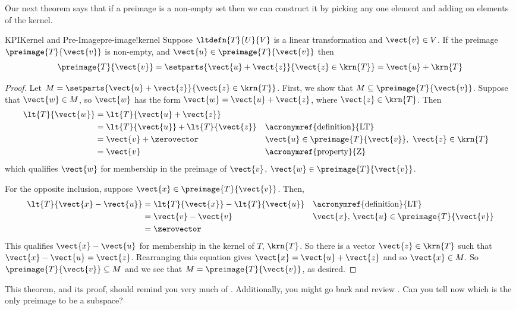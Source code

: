 %
Our next theorem says that if a preimage is a non-empty set then we can construct it by picking any one element and adding on elements of the kernel.
%
\begin{theorem}{KPI}{Kernel and Pre-Image}{pre-image!kernel}
Suppose $\ltdefn{T}{U}{V}$ is a linear transformation and $\vect{v}\in V$.  If the preimage $\preimage{T}{\vect{v}}$ is non-empty, and $\vect{u}\in\preimage{T}{\vect{v}}$  then 
%
\begin{equation*}
\preimage{T}{\vect{v}}=
\setparts{\vect{u}+\vect{z}}{\vect{z}\in\krn{T}}
=\vect{u}+\krn{T}
\end{equation*}
%
\end{theorem}
%
\begin{proof}
Let $M=\setparts{\vect{u}+\vect{z}}{\vect{z}\in\krn{T}}$.  First, we show that $M\subseteq\preimage{T}{\vect{v}}$.  Suppose that $\vect{w}\in M$, so $\vect{w}$ has the form $\vect{w}=\vect{u}+\vect{z}$, where $\vect{z}\in\krn{T}$.  Then
%
\begin{align*}
\lt{T}{\vect{w}}&=\lt{T}{\vect{u}+\vect{z}}\\
&=\lt{T}{\vect{u}}+\lt{T}{\vect{z}}&&\text{\acronymref{definition}{LT}}\\
&=\vect{v}+\zerovector&&\vect{u}\in\preimage{T}{\vect{v}},\ \vect{z}\in\krn{T}\\
&=\vect{v}&&\text{\acronymref{property}{Z}}
\end{align*}
%
which qualifies $\vect{w}$ for membership in the preimage of $\vect{v}$, $\vect{w}\in\preimage{T}{\vect{v}}$.\par
%
For the opposite inclusion, suppose $\vect{x}\in\preimage{T}{\vect{v}}$.  Then,
%
\begin{align*}
\lt{T}{\vect{x}-\vect{u}}&=\lt{T}{\vect{x}}-\lt{T}{\vect{u}}&&\text{\acronymref{definition}{LT}}\\
&=\vect{v}-\vect{v}&&\vect{x},\,\vect{u}\in\preimage{T}{\vect{v}}\\
&=\zerovector
\end{align*}
%
This qualifies $\vect{x}-\vect{u}$ for membership in the kernel of $T$, $\krn{T}$.  So there is a vector $\vect{z}\in\krn{T}$ such that $\vect{x}-\vect{u}=\vect{z}$.  Rearranging this equation gives $\vect{x}=\vect{u}+\vect{z}$ and so $\vect{x}\in M$.  So $\preimage{T}{\vect{v}}\subseteq M$ and we see that $M=\preimage{T}{\vect{v}}$, as desired.
%
\end{proof}
%
This theorem, and its proof, should remind you very much of .  Additionally, you might go back and review .  Can you tell now which is the only preimage to be a subspace?\par

